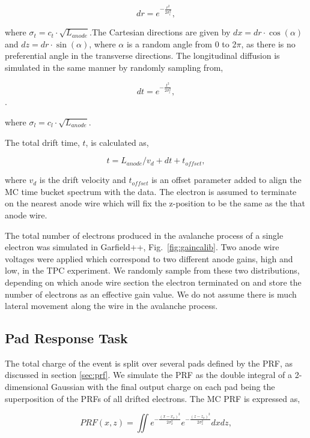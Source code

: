 \begin{equation}
dr = e^{-\frac{r^2}{2\sigma_{t}^2}},
\end{equation}

where $\sigma_{t}=c_{t}\cdot\sqrt{L_{anode}}$.The Cartesian directions are given by $dx = dr \cdot \cos(\alpha)$ and $dz = dr \cdot \sin(\alpha)$, where $\alpha$ is a random angle from 0 to 2$\pi$, as there is no preferential angle in the transverse directions. The longitudinal diffusion is simulated in the same manner by randomly sampling from, 

\begin{equation}
dt = e^{-\frac{t^2}{2\sigma_{l}^2}},
\end{equation}.

where $\sigma_{l}=c_{l}\cdot\sqrt{L_{anode}}$. 

The total drift time, $t$, is calculated as,

\begin{equation}
 t = L_{anode}/v_d + dt + t_{offset},
\end{equation}
 
 where $v_d$ is the drift velocity and $t_{offset}$ is an offset parameter added to align the MC time bucket spectrum with the data. The electron is assumed to terminate on the nearest anode wire which will fix the z-position to be the same as the that anode wire. 

The total number of electrons produced in the avalanche process of a single electron was simulated in Garfield++, Fig.~\ref{fig:gaincalib}. Two anode wire voltages were applied which correspond to two different anode gains, high and low, in the TPC experiment. We randomly sample from these two distributions, depending on which anode wire section the electron terminated on and store the number of electrons as an effective gain value. We do not assume there is much lateral movement along the wire in the avalanche process. 

\subsection{Pad Response Task}
The total charge of the event is split over several pads defined by the PRF, as discussed in section \ref{sec:prf}. We simulate the PRF as the double integral of a 2-dimensional Gaussian with the final output charge on each pad being the superposition of the PRFs of all drifted electrons. The MC PRF is expressed as, 

\begin{equation}
PRF(x,z) = \iint e^{-\frac{(x-x_o)^2}{2\sigma_x^2}} e^{-\frac{(z-z_o)^2}{2\sigma_z^2}}dxdz,
\end{equation}

